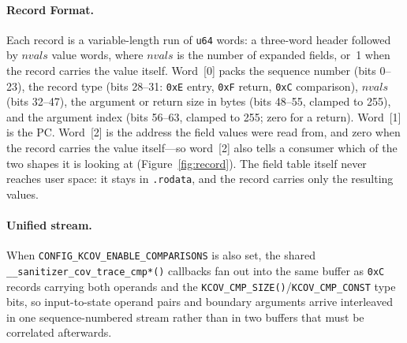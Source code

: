\documentclass{article}
\begin{document}
\paragraph{Record Format.} Each record is a variable-length run of
\texttt{u64} words: a three-word header followed by $\mathit{nvals}$ value
words, where $\mathit{nvals}$ is the number of expanded fields, or~1 when the
record carries the value itself. Word~[0] packs the sequence number
(bits 0--23), the record type (bits 28--31: \texttt{0xE} entry, \texttt{0xF}
return, \texttt{0xC} comparison), $\mathit{nvals}$ (bits 32--47), the argument
or return size in bytes (bits 48--55, clamped to 255), and the argument index
(bits 56--63, clamped to 255; zero for a return). Word~[1] is the PC. Word~[2]
is the address the field values were read from, and zero when the record
carries the value itself---so word~[2] also tells a consumer which of the two
shapes it is looking at (Figure~\ref{fig:record}). The field table itself never
reaches user space: it stays in \texttt{.rodata}, and the record carries only
the resulting values.

\paragraph{Unified stream.} When \texttt{CONFIG\_KCOV\_ENABLE\_COMPARISONS} is
also set, the shared \texttt{\_\_sanitizer\_cov\_trace\_cmp*()} callbacks fan
out into the same buffer as \texttt{0xC} records carrying both operands and the
\texttt{KCOV\_CMP\_SIZE()}/\texttt{KCOV\_CMP\_CONST} type bits, so
input-to-state operand pairs and boundary arguments arrive interleaved in one
sequence-numbered stream rather than in two buffers that must be correlated
afterwards.
\end{document}
